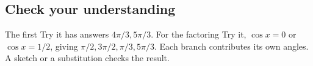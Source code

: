 \hypertarget{m5-check-your-understanding}{%
\subsection{Check your understanding}\label{m5-check-your-understanding}}

The first Try it has answers \(4\pi/3,5\pi/3\). For the factoring Try it, \(\cos x=0\) or \(\cos x=1/2\), giving \(\pi/2,3\pi/2,\pi/3,5\pi/3\). Each branch contributes its own angles. A sketch or a substitution checks the result.

\clearpage
